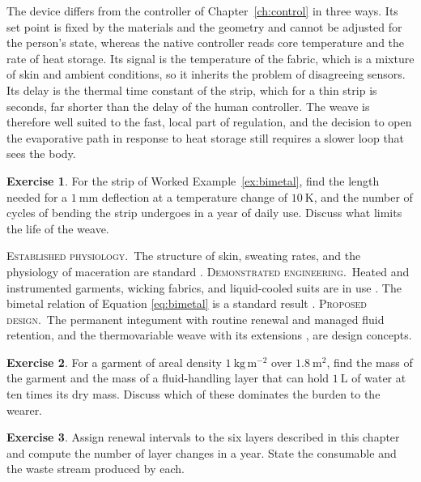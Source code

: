 \documentclass[11pt,openany]{book}
\theoremstyle{definition}
\newtheorem{exercise}{Exercise}[chapter]
\theoremstyle{remark}
\newcommand{\est}{\textsc{Established physiology.}\ }
\newcommand{\dem}{\textsc{Demonstrated engineering.}\ }
\newcommand{\pro}{\textsc{Proposed design.}\ }
\begin{document}
The device differs from the controller of Chapter~\ref{ch:control} in three ways. Its set point is fixed by the materials and the geometry and cannot be adjusted for the person's state, whereas the native controller reads core temperature and the rate of heat storage. Its signal is the temperature of the fabric, which is a mixture of skin and ambient conditions, so it inherits the problem of disagreeing sensors. Its delay is the thermal time constant of the strip, which for a thin strip is seconds, far shorter than the delay of the human controller. The weave is therefore well suited to the fast, local part of regulation, and the decision to open the evaporative path in response to heat storage still requires a slower loop that sees the body.

\begin{exercise}
For the strip of Worked Example~\ref{ex:bimetal}, find the length needed for a $1\ \mathrm{mm}$ deflection at a temperature change of $10\ \mathrm{K}$, and the number of cycles of bending the strip undergoes in a year of daily use. Discuss what limits the life of the weave.
\end{exercise}

\begin{evidence}
\est The structure of skin, sweating rates, and the physiology of maceration are standard \cite{guyton2021,silver2001}. \dem Heated and instrumented garments, wicking fabrics, and liquid-cooled suits are in use \cite{eckart1996}. The bimetal relation of Equation \eqref{eq:bimetal} is a standard result \cite{timoshenko1925}. \pro The permanent integument with routine renewal and managed fluid retention, and the thermovariable weave with its extensions \cite{flyxion2026hl}, are design concepts.
\end{evidence}

\begin{exercise}
For a garment of areal density $1\ \mathrm{kg\,m^{-2}}$ over $1.8\ \mathrm{m^{2}}$, find the mass of the garment and the mass of a fluid-handling layer that can hold $1\ \mathrm{L}$ of water at ten times its dry mass. Discuss which of these dominates the burden to the wearer.
\end{exercise}

\begin{exercise}
Assign renewal intervals to the six layers described in this chapter and compute the number of layer changes in a year. State the consumable and the waste stream produced by each.
\end{exercise}
\end{document}
